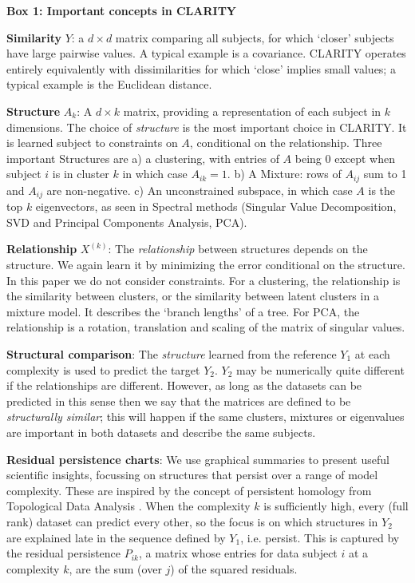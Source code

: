 \documentclass[a4]{article}
\newcommand{\+}[1]{\mathbf{#1}}
\begin{document}
\begin{mybox}
 \label{box:1}
 {\bf Box 1: Important concepts in CLARITY}
    
 {\bf Similarity} $Y$: a $d \times d$ matrix comparing all subjects, for which `closer' subjects have large pairwise values. A typical example is a covariance. CLARITY operates entirely equivalently with dissimilarities for which `close' implies small values; a typical example is the Euclidean distance.
 
 {\bf Structure} $A_k$: A $d \times k$ matrix, providing a representation of each subject in $k$ dimensions.  The choice of \emph{structure} is the most important choice in CLARITY. It is learned subject to constraints on $A$, conditional on the relationship. Three important Structures are a) a clustering, with entries of $A$ being $0$ except when subject $i$ is in cluster $k$ in which case $A_{ik}=1$. b) A Mixture: rows of $A_{ij}$ sum to 1 and $A_{ij}$ are non-negative. c) An unconstrained subspace, in which case $A$ is the top $k$ eigenvectors, as seen in Spectral methods (Singular Value Decomposition, SVD and Principal Components Analysis, PCA).

{\bf Relationship} $X^{(k)}$: The \emph{relationship} between structures depends on the structure. We again learn it by minimizing the error conditional on the structure. In this paper we do not consider constraints. For a clustering, the relationship is the similarity between clusters, or the similarity between latent clusters in a mixture model. It describes the `branch lengths' of a tree. For PCA, the relationship is a rotation, translation and scaling of the matrix of singular values.

{\bf Structural comparison}: The \emph{structure} learned from the reference $Y_1$ at each complexity is used to predict the target $Y_2$. $Y_2$ may be numerically quite different if the relationships are different. However, as long as the datasets can be predicted in this sense then we say that the matrices are defined to be \emph{structurally similar}; this will happen if the same clusters, mixtures or eigenvalues are important in both datasets and describe the same subjects.

{\bf Residual persistence charts}: We use graphical summaries to present useful scientific insights, focussing on structures that persist over a range of model complexity. These are inspired by the concept of persistent homology from Topological Data Analysis \cite{WassermanTopologicalDataAnalysis2018}.  When the complexity $k$ is sufficiently high, every (full rank) dataset can predict every other, so the focus is on which structures in $Y_2$ are explained late in the sequence defined by $Y_1$, i.e. persist. This is captured by the residual persistence $P_{ik}$, a matrix whose entries for data subject $i$ at a complexity $k$, are the sum (over $j$) of the squared residuals. %
\end{mybox}
\end{document}

